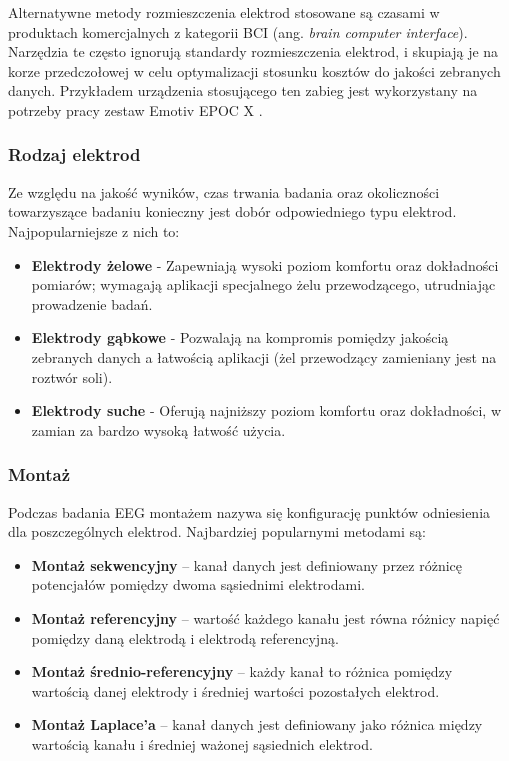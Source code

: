 \documentclass{./assets/wfis}
\begin{document}
Alternatywne metody rozmieszczenia elektrod stosowane są czasami w produktach komercjalnych z kategorii BCI (ang. \textit{brain computer interface}). Narzędzia te często ignorują standardy rozmieszczenia elektrod, i skupiają je na korze przedczołowej w celu optymalizacji stosunku kosztów do jakości zebranych danych. Przykładem urządzenia stosującego ten zabieg jest wykorzystany na potrzeby pracy zestaw Emotiv EPOC X \cite{emotiv_inc_epoc_nodate}. 


\subsubsection{Rodzaj elektrod}
Ze względu na jakość wyników, czas trwania badania oraz okoliczności towarzyszące badaniu konieczny jest dobór odpowiedniego typu elektrod. Najpopularniejsze z nich to:

\begin{itemize}
    \item \textbf{Elektrody żelowe} - Zapewniają wysoki poziom komfortu oraz dokładności pomiarów; wymagają aplikacji specjalnego żelu przewodzącego, utrudniając prowadzenie badań.
    \item \textbf{Elektrody gąbkowe} - Pozwalają na kompromis pomiędzy jakością zebranych danych a łatwością aplikacji (żel przewodzący zamieniany jest na roztwór soli).
    \item \textbf{Elektrody suche} - Oferują najniższy poziom komfortu oraz dokładności, w zamian za bardzo wysoką łatwość użycia.
\end{itemize}

\subsubsection{Montaż}
Podczas badania EEG montażem nazywa się konfigurację punktów odniesienia dla poszczególnych elektrod. Najbardziej popularnymi metodami są:
\begin{itemize}
    \item \textbf{Montaż sekwencyjny} – kanał danych jest definiowany przez różnicę potencjałów pomiędzy dwoma sąsiednimi elektrodami.
    \item \textbf{Montaż referencyjny} – wartość każdego kanału jest równa różnicy napięć pomiędzy daną elektrodą i elektrodą referencyjną.
    \item \textbf{Montaż średnio-referencyjny} – każdy kanał to różnica pomiędzy wartością danej elektrody i średniej wartości pozostałych elektrod. 
    \item \textbf{Montaż Laplace’a} – kanał danych jest definiowany jako różnica między wartością kanału i średniej ważonej sąsiednich elektrod.
\end{itemize}
\end{document}
